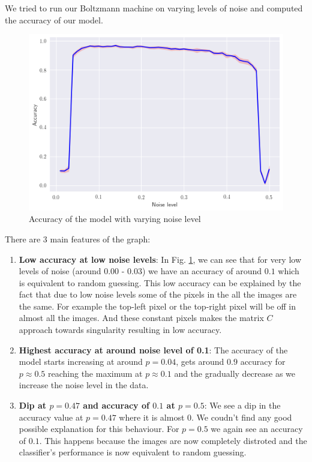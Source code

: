 \documentclass{article}
\begin{document}
We tried to run our Boltzmann machine on varying levels of noise and computed
the accuracy of our model.

\begin{figure}[ht]
  \centering
  \includegraphics[width=\textwidth]{noise_vs_acc}
  \caption{Accuracy of the model with varying noise level}
  \label{fig:noise_vs_acc}
\end{figure}

There are 3 main features of the graph:
\begin{enumerate}

  \item \textbf {Low accuracy at low noise levels}:
    In Fig. \ref{fig:noise_vs_acc}, we can see that for very low levels of noise 
    (around 0.00 - 0.03) we have an accuracy of around $ 0.1 $ which is 
    equivalent to random guessing. This low accuracy can be explained by the 
    fact that due to low noise levels some of the pixels in the all the images
    are the same. For example the top-left pixel or the top-right pixel will
    be off in almost all the images. And these constant pixels makes the matrix
    $ C $ approach towards singularity resulting in low accuracy.

  \item \textbf{Highest accuracy at around noise level of 0.1}:
    The accuracy of the model starts increasing at around $ p=0.04 $, gets 
    around $ 0.9 $ accuracy for $ p \approx 0.5 $ reaching the maximum at 
    $ p \approx 0.1 $ and the gradually decrease as we increase the noise
    level in the data.

  \item \textbf{Dip at $ p=0.47 $ and accuracy of $ 0.1 $ at $ p=0.5 $}:
    We see a dip in the accuracy value at $ p=0.47 $ where it is almost $ 0 $.
    We coudn't find any good possible explanation for this behaviour. For 
    $ p = 0.5 $ we again see an accuracy of $ 0.1 $. This happens because the 
    images are now completely distroted and the classifier's performance is
    now equivalent to random guessing.

\end{enumerate}
\end{document}
